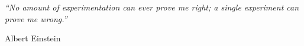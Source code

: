 
\clearpage

\null\vfill\vfill %


\textit{``No amount of experimentation can ever prove me right; a single experiment can prove me
wrong.''}

\begin{flushright}
Albert Einstein
\end{flushright}

\vfill\vfill\vfill\vfill\vfill\vfill\null %

